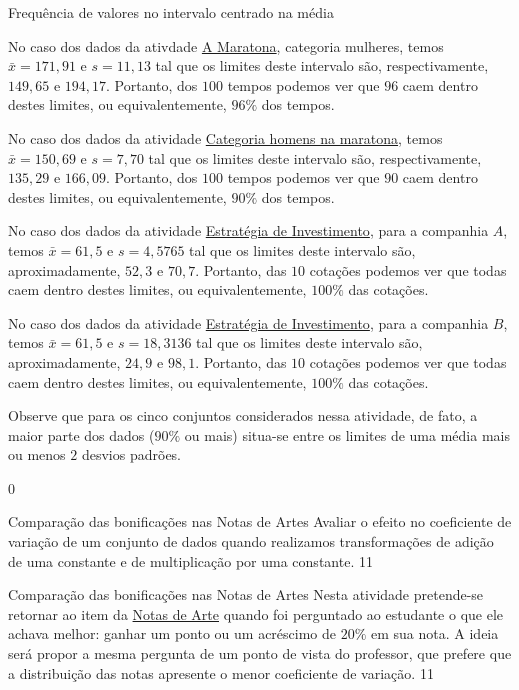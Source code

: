{{{\begin{answer}{Frequência de valores no intervalo centrado na média}
{No caso dos dados da ativdade \hyperref[\detokenize{PE104-0:ativ-maratona-de-ny}]{A Maratona}, categoria mulheres, temos $\bar{x}=171{,}91$ e $s=11{,}13$ tal que os limites deste intervalo são, respectivamente, $149{,}65$ e $194{,}17$. Portanto, dos $100$ tempos podemos ver que $96$ caem dentro destes limites, ou equivalentemente, $96\%$ dos tempos.

No caso dos dados da atividade \hyperref[\detokenize{PE104-2:ativ-maratona-categoria-homens}]{Categoria  homens na maratona}, temos $\bar{x}=150{,}69$ e $s=7{,}70$ tal que os limites deste intervalo são, respectivamente, $135{,}29$ e $166{,}09$. Portanto, dos $100$ tempos podemos ver que $90$ caem dentro destes limites, ou equivalentemente, $90\%$ dos tempos.

No caso dos dados da atividade \hyperref[\detokenize{PE104-3:ativ-estrategia-de-investimento}]{Estratégia de Investimento}, para a companhia $A$, temos $\bar{x}=61{,}5$ e $s=4{,}5765$ tal que os limites deste intervalo são, aproximadamente, $52{,}3$ e $70{,}7$. Portanto, das $10$ cotações podemos ver que todas caem dentro destes limites, ou equivalentemente, $100\%$ das cotações.

No caso dos dados da atividade \hyperref[\detokenize{PE104-3:ativ-estrategia-de-investimento}]{Estratégia de Investimento}, para a companhia $B$, temos $\bar{x}=61{,}5$ e $s=18{,}3136$ tal que os limites deste intervalo são, aproximadamente, $24{,}9$ e $98{,}1$. Portanto, das $10$ cotações podemos ver que todas caem dentro destes limites, ou equivalentemente, $100\%$ das cotações.

Observe que para os cinco conjuntos considerados nessa atividade, de fato, a maior parte dos dados ($90\%$ ou mais) situa-se entre os limites de uma média mais ou menos $2$ desvios padrões.
}{0}
\end{answer}

\begin{objectives}{Comparação das bonificações nas Notas de Artes}
{
Avaliar o efeito no coeficiente de variação de um conjunto de dados quando realizamos transformações de adição de uma constante e de multiplicação por uma constante.
}{1}{1}
\end{objectives}

\begin{sugestions}{Comparação das bonificações nas Notas de Artes}
{
Nesta atividade pretende-se retornar ao item  da \hyperref[\detokenize{PE104-0:ativ-notas-de-artes}]{Notas de Arte} quando foi perguntado ao estudante o que ele achava melhor: ganhar um ponto ou um acréscimo de $20\%$ em sua nota. A ideia será propor a mesma pergunta de um ponto de vista do professor, que prefere que a distribuição das notas apresente o menor coeficiente de variação.
}{1}{1}
\end{sugestions}

}}}
